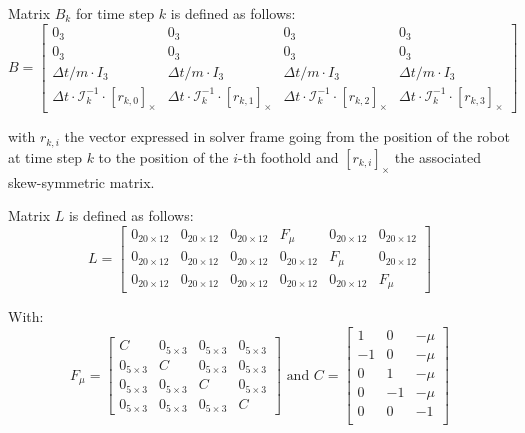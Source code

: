\documentclass[a4paper,11pt]{article}
\begin{document}
Matrix $B_k$ for time step $k$ is defined as follows:
\begin{equation}
B = \begin{bmatrix} 
0_3 & 0_3 & 0_3 & 0_3 \\
0_3 & 0_3 & 0_3 & 0_3 \\
\Delta t/m \cdot I_3 & \Delta t/m \cdot I_3 & \Delta t/m \cdot I_3 & \Delta t/m \cdot I_3 \\
\Delta t \cdot \mathcal{I}_k^{-1} \cdot [r_{k,0}]_\times & \Delta t \cdot \mathcal{I}_k^{-1} \cdot [r_{k,1}]_\times & \Delta t \cdot \mathcal{I}_k^{-1} \cdot [r_{k,2}]_\times & \Delta t \cdot \mathcal{I}_k^{-1} \cdot [r_{k,3}]_\times
\end{bmatrix}
\end{equation}

with $r_{k,i}$ the vector expressed in solver frame going from the position of the robot at time step $k$ to the position of the $i$-th foothold and $[r_{k,i}]_\times$ the associated skew-symmetric matrix.

Matrix $L$ is defined as follows:
\begin{equation}
L = \begin{bmatrix} 
	0_{20\times12} & 0_{20\times12} & 0_{20\times12}  & F_\mu  & 0_{20\times12} & 0_{20\times12} \\
	0_{20\times12} & 0_{20\times12} & 0_{20\times12}  & 0_{20\times12} & F_\mu  & 0_{20\times12} \\
	0_{20\times12} & 0_{20\times12} & 0_{20\times12}  & 0_{20\times12} & 0_{20\times12} & F_\mu  \end{bmatrix}
\end{equation}

With:
\begin{equation}
F_\mu = \begin{bmatrix} 
	C  & 0_{5\times3} & 0_{5\times3} & 0_{5\times3} \\
	0_{5\times3} & C & 0_{5\times3} & 0_{5\times3} \\
	0_{5\times3}  & 0_{5\times3} & C & 0_{5\times3} \\
	0_{5\times3}  & 0_{5\times3} & 0_{5\times3} & C
\end{bmatrix} \text{ and } C = \begin{bmatrix} 
1  & 0 & -\mu \\
-1 & 0 & -\mu \\
0  & 1 & -\mu \\
0  & -1 & -\mu \\
0  & 0 & - 1 \\
\end{bmatrix}
\end{equation}
\end{document}
